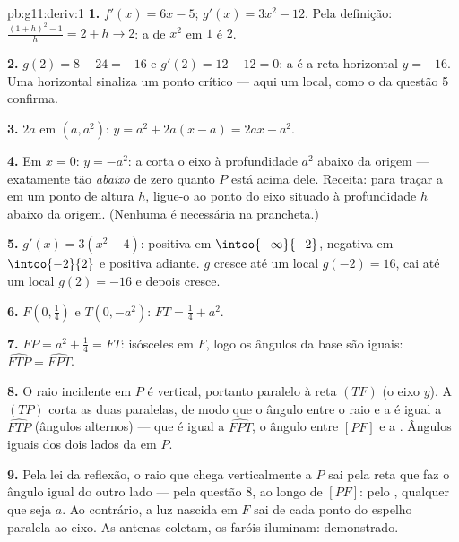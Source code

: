 \begin{solution}{pb:g11:deriv:1}
\textbf{1.} $f'(x) = 6x - 5$; $g'(x) = 3x^2 - 12$. Pela
definição: $\frac{(1 + h)^2 - 1}{h} = 2 + h \to 2$: a 
de $x^2$ em $1$ é $2$.

\textbf{2.} $g(2) = 8 - 24 = -16$ e $g'(2) = 12 - 12 = 0$: a
 é a reta horizontal $y = -16$. Uma  horizontal
sinaliza um ponto crítico --- aqui um  local, como o
 da questão 5 confirma.

\textbf{3.}  $2a$ em $(a, a^2)$:
$y = a^2 + 2a(x - a) = 2ax - a^2$.

\textbf{4.} Em $x = 0$: $y = -a^2$: a  corta o eixo à
profundidade $a^2$ abaixo da origem --- exatamente tão
\emph{abaixo} de zero quanto $P$ está acima dele. Receita: para
traçar a  em um ponto de altura $h$, ligue-o ao ponto
do eixo situado à profundidade $h$ abaixo da origem. (Nenhuma
 é necessária na prancheta.)

\textbf{5.} $g'(x) = 3(x^2 - 4)$: positiva em
$\intoo{-\infty}{-2}$, negativa em $\intoo{-2}{2}$ e positiva
adiante. $g$ cresce até um  local $g(-2) = 16$, cai até
um  local $g(2) = -16$ e depois cresce.

\textbf{6.} $F\left(0, \frac14\right)$ e $T(0, -a^2)$:
$FT = \frac14 + a^2$.

\textbf{7.} $FP = a^2 + \frac14 = FT$: isósceles em $F$, logo os
ângulos da base são iguais: $\widehat{FTP} = \widehat{FPT}$.

\textbf{8.} O raio incidente em $P$ é vertical, portanto
paralelo à reta $(TF)$ (o eixo $y$). A  $(TP)$ corta as
duas paralelas, de modo que o ângulo entre o raio e a 
é igual a $\widehat{FTP}$ (ângulos alternos) --- que é igual a
$\widehat{FPT}$, o ângulo entre $[PF]$ e a . Ângulos
iguais dos dois lados da  em $P$.

\textbf{9.} Pela lei da reflexão, o raio que chega
verticalmente a $P$ sai pela reta que faz o ângulo igual do
outro lado --- pela questão 8, ao longo de $[PF]$: pelo ,
qualquer que seja $a$. Ao contrário, a luz nascida em $F$ sai
de cada ponto do espelho paralela ao eixo. As antenas coletam,
os faróis iluminam: demonstrado.


\end{solution}
